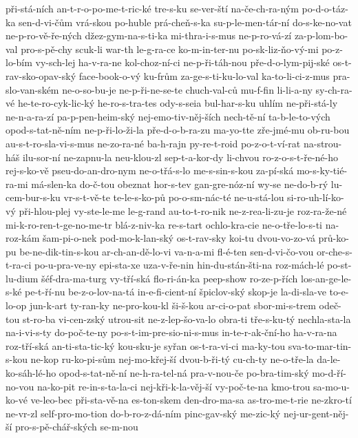 při-stá-ních
an-t-r-o-po-me-t-ric-ké
tre-s-ku
se-ver-ští
na-če-ch-ra-ným
po-d-o-táz-ka
sen-d-vi-čům
vrá-skou
po-huble
prá-cheň-s-ka
su-p-le-men-tár-ní
do-s-ke-no-vat
ne-p-ro-vě-ře-ných
džez-gym-na-s-ti-ka
mi-thra-i-s-mus
ne-p-ro-vá-zí
za-p-lom-bo-val
pro-s-pě-chy
scuk-li
war-th
le-g-ra-ce
ko-m-in-ter-nu
po-sk-liz-ňo-vý-mi
po-z-lo-bím
vy-sch-lej
ha-v-ra-ne
kol-choz-ní-ci
ne-p-ři-táh-nou
pře-d-o-lym-pij-ské
os-t-rav-sko-opav-ský
face-book-o-vý
ku-frům
za-ge-s-ti-ku-lo-val
ka-to-li-ci-z-mus
pra-slo-van-ském
ne-o-so-bu-je
ne-p-ři-ne-se-te
chuch-val-ců
mu-f-fin
li-li-a-ny
sy-ch-ra-vé
he-te-ro-cyk-lic-ký
he-ro-s-tra-tes
ody-s-seia
bul-har-s-ku
uhlím
ne-při-stá-ly
ne-n-a-ra-zí
pa-p-pen-heim-ský
nej-emo-tiv-něj-ších
nech-tě-ní
ta-b-le-to-vých
opod-s-tat-ně-ním
ne-p-ři-lo-ži-la
pře-d-o-b-ra-zu
ma-yo-tte
zře-jmé-mu
ob-ru-bou
au-s-t-ro-sla-vi-s-mus
ne-zo-ra-né
ba-h-rajn
py-re-t-roid
po-z-o-t-ví-rat
na-strou-háš
ilu-sor-ní
ne-zapnu-la
neu-klou-zl
sep-t-a-kor-dy
li-chvou
ro-z-o-s-t-ře-né-ho
rej-s-ko-vě
pseu-do-an-dro-nym
ne-o-třá-s-lo
me-s-sin-s-kou
za-pí-ská
mo-s-ky-tié-ra-mi
má-slen-ka
do-č-tou
obeznat
hor-s-tev
gan-gre-nóz-ní
wy-se
ne-do-b-rý
lu-cem-bur-s-ku
vr-s-t-vě-te
te-le-s-ko-pů
po-o-sm-nác-té
ne-u-stá-lou
si-ro-uh-lí-ko-vý
při-hlou-plej
vy-ste-le-me
le-g-rand
au-to-t-ro-nik
ne-z-rea-li-zu-je
roz-ra-že-né
mi-k-ro-ren-t-ge-no-me-tr
blá-z-niv-ka
re-s-tart
ochlo-kra-cie
ne-o-tře-lo-s-ti
na-roz-kám
šam-pi-o-nek
pod-mo-k-lan-ský
os-t-rav-sky
koi-tu
dvou-vo-zo-vá
prů-ko-pu
be-ne-dik-tin-s-kou
ar-ch-an-dě-lo-vi
va-n-a-mi
fl-é-ten
sen-d-vi-čo-vou
or-che-s-t-ra-ci
po-u-pra-ve-ny
epi-sta-xe
uza-v-ře-nin
hin-du-stán-šti-na
roz-mách-lé
po-st-lu-dium
šéf-dra-ma-turg
vy-tří-ská
flo-ri-án-ka
peep-show
ro-ze-p-řích
los-an-ge-le-s-ké
pe-t-ří-nu
be-z-o-lov-na-tá
in-e-fi-cient-ní
špiclov-ský
skop-je
la-di-sla-ve
to-e-lo-op
jun-k-art
ty-ran-ky
ne-pro-kou-kl
ši-š-kou
ar-ci-o-pat
sbor-mi-s-trem
odeč-tou
st-ro-ba
vi-cen-zský
utrou-sit
ne-z-lep-šo-va-lo
obra-ti
tře-s-ku-tý
nechla-sta-la
na-i-vi-s-ty
do-poč-te-ny
po-s-t-im-pre-sio-ni-s-mus
in-te-r-ak-ční-ho
ha-v-ra-na
roz-tří-ská
an-ti-sta-tic-ký
kou-sku-je
syřan
os-t-ra-vi-ci
ma-ky-tou
sva-to-mar-tin-s-kou
ne-kop
ru-ko-pi-sům
nej-mo-křej-ší
dvou-b-ři-tý
cu-ch-ty
ne-o-tře-la
da-le-ko-sáh-lé-ho
opod-s-tat-ně-ní
ne-h-ra-tel-ná
pra-v-nou-če
po-bra-tim-ský
mo-d-ří-no-vou
na-ko-pit
re-in-s-ta-la-ci
nej-kři-k-la-věj-ší
vy-poč-te-na
kmo-trou
sa-mo-u-ko-vé
ve-leo-bec
při-sta-vě-na
es-ton-skem
den-dro-ma-sa
as-tro-me-t-rie
ne-zkro-tí
ne-vr-zl
self-pro-mo-tion
do-b-ro-z-dá-ním
pinc-gav-ský
me-zic-ký
nej-ur-gent-něj-ší
pro-s-pě-chář-ských
se-m-nou
